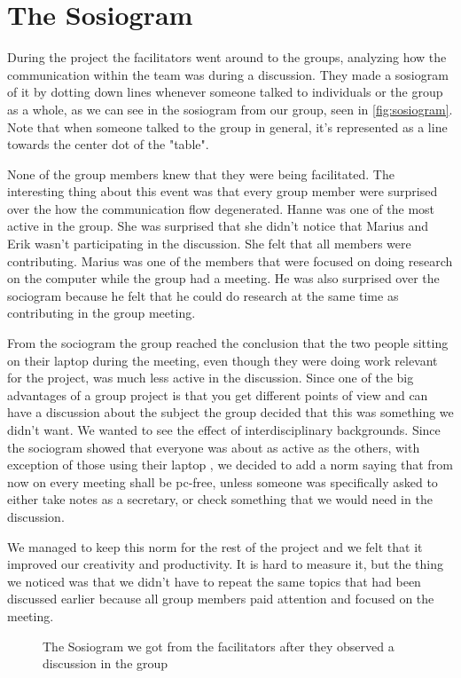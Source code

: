 \section{The Sosiogram}
During the project the facilitators went around to the groups, analyzing how the communication within the team was during a discussion. They made a sosiogram of it by dotting down lines whenever someone talked to individuals or the group as a whole, as we can see in the sosiogram from our group, seen in \autoref{fig:sosiogram}. Note that when someone talked to the group in general, it's represented as a line towards the center dot of the "table".



None of the group members knew that they were being facilitated. The interesting thing about this event was that every group member were surprised over the how the communication flow degenerated. Hanne was one of the most active in the group. She was surprised that she didn't notice that  Marius and Erik wasn’t participating in the discussion. She felt that all members were contributing. Marius was one of the members that were focused on doing research on the computer while the group had a meeting. He was also surprised over the sociogram because he felt that he could do research at the same time as contributing in the group meeting. 

From the sociogram the group reached the conclusion that the two people sitting on their laptop during the meeting, even though they were doing work relevant for the project, was much less active in the discussion. Since one of the big advantages of a group project is that you get different points of view and can have a discussion about the subject the group decided that this was something we didn't want. We wanted to see the effect of interdisciplinary backgrounds. Since the sociogram showed that everyone was about as active as the others, with exception of those using their laptop , we decided to add a norm saying that from now on every meeting shall be pc-free, unless someone was specifically asked to either take notes as a secretary, or check something that we would need in the discussion.

We managed to keep this norm for the rest of the project and we felt that it improved our creativity and productivity. It is hard to measure it, but the thing we noticed was that we didn't have to repeat the same topics that had been discussed earlier because all group members paid attention and focused on the meeting. 
\newpage{}
\begin{figure}
	\begin{center}
	\end{center}
	\caption[The Sosiogram]{The Sosiogram we got from the facilitators after they observed a discussion in the group}
	\label{fig:sosiogram}
\end{figure}